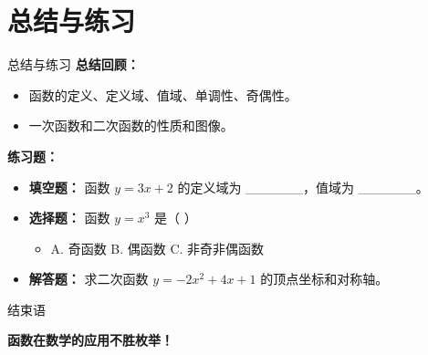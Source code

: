 \documentclass[aspectratio=169]{ctexbeamer} %
\begin{document}
\section{总结与练习}
\begin{frame}{总结与练习}
    \textbf{总结回顾：}
    \begin{itemize}
        \item 函数的定义、定义域、值域、单调性、奇偶性。
        \item 一次函数和二次函数的性质和图像。
    \end{itemize}

    \vspace{0.5cm}
    \textbf{练习题：}
    \begin{itemize}
        \item \textbf{填空题：} 函数 \( y = 3x + 2 \) 的定义域为 \_\_\_\_\_\_，值域为 \_\_\_\_\_\_。
        \item \textbf{选择题：} 函数 \( y = x^3 \) 是（  ）
        \begin{itemize}
            \item A. 奇函数  B. 偶函数  C. 非奇非偶函数
        \end{itemize}
        \item \textbf{解答题：} 求二次函数 \( y = -2x^2 + 4x + 1 \) 的顶点坐标和对称轴。
    \end{itemize}
\end{frame}

\begin{frame}{结束语}
    \begin{center}
        \textbf{函数在数学的应用不胜枚举！} \\
    \end{center}
\end{frame}
\end{document}
